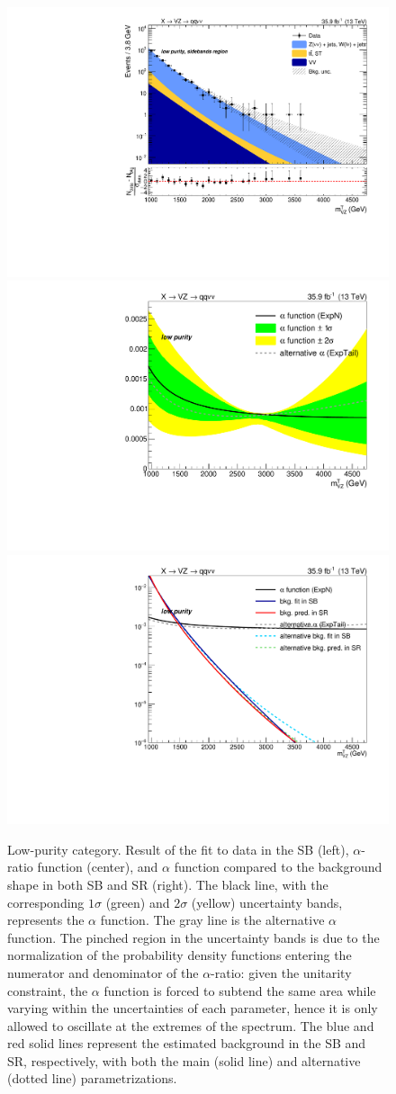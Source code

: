 \begin{figure}[!htb]
  \centering
    \includegraphics[width=.33\textwidth]{plotsAlpha_tesi/XVZnnlp/BkgSB.pdf}
    \includegraphics[width=.33\textwidth]{plotsAlpha_tesi/XVZnnlp/AlphaRatio.pdf}
    \includegraphics[width=.33\textwidth]{plotsAlpha_tesi/XVZnnlp/AlphaMethod_log.pdf}
  \caption{Low-purity category. Result of the fit to data in the SB (left), $\alpha$-ratio function (center), and $\alpha$ function compared to the background shape in both SB and SR (right). The black line, with the corresponding $1\sigma$ (green) and $2\sigma$ (yellow) uncertainty bands, represents the $\alpha$ function. The gray line is the alternative $\alpha$ function. The pinched region in the uncertainty bands is due to the normalization of the probability density functions entering the numerator and denominator of the $\alpha$-ratio: given the unitarity constraint, the $\alpha$ function is forced to subtend the same area while varying within the uncertainties of each parameter, hence it is only allowed to oscillate at the extremes of the spectrum. The blue and red solid lines represent the estimated background in the SB and SR, respectively, with both the main (solid line) and alternative (dotted line) parametrizations.}
  \label{fig:XVZnnlp_Alpha}
\end{figure}


